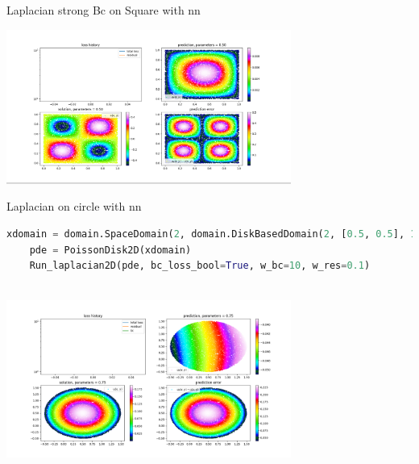 \documentclass[12pt]{article}
\begin{document}
Laplacian strong Bc on Square with nn
\begin{frame}{}
    \begin{center}
        \includegraphics[width=0.7\textwidth]{images/scimbaplot1.png}
    \end{center}
\end{frame}
Laplacian on circle with nn
\begin{lstlisting}[language=Python,caption={},frame=single, backgroundcolor=\color{gray!10}, basicstyle=\footnotesize,rulecolor=\color{blue}, framexleftmargin=3pt, commentstyle=\color{mygreen}, keywordstyle=\color{blue}]
    xdomain = domain.SpaceDomain(2, domain.DiskBasedDomain(2, [0.5, 0.5], 1.0))
    pde = PoissonDisk2D(xdomain)
    Run_laplacian2D(pde, bc_loss_bool=True, w_bc=10, w_res=0.1)
    
\end{lstlisting}
\begin{frame}{}
    \begin{center}
        \includegraphics[width=0.7\textwidth]{images/scimbaplot2.png}
        \end{center}
\end{frame}

\newpage
\end{document}
